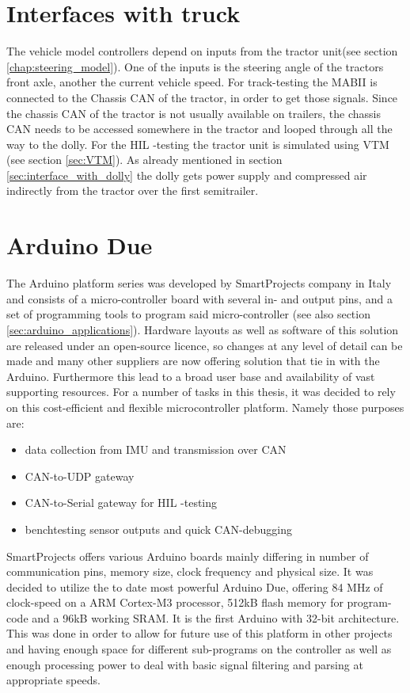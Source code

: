 \documentclass[ExampleMasters.tex]{subfiles}
\begin{document}
\section{Interfaces with truck}
\label{sec:interface_with_truck}
The vehicle model controllers depend on inputs from the tractor unit(see section \ref{chap:steering_model}). One of the inputs is the steering angle of the tractors front axle, another the current vehicle speed. For track-testing the \gls{MABII} is connected to the Chassis \gls{CAN} of the tractor, in order to get those signals. Since the chassis \gls{CAN} of the tractor is not usually available on trailers, the chassis \gls{CAN} needs to be accessed somewhere in the tractor and looped through all the way to the dolly.   
For the \gls{HIL} -testing the tractor unit is simulated using \gls{VTM}  (see section \ref{sec:VTM}). As already mentioned in section \ref{sec:interface_with_dolly} the dolly gets power supply and compressed air indirectly from the tractor over the first semitrailer.

\section{Arduino Due}
\label{sec:arduino}

The Arduino platform series was developed by  SmartProjects company in Italy and consists of a micro-controller board with several in- and output pins, and a set of programming tools to program said micro-controller (see also section \ref{sec:arduino_applications}). Hardware layouts as well as software of this solution are released under an open-source licence, so changes at any level of detail can be made and many other suppliers are now offering solution that tie in with the Arduino. Furthermore this lead to a broad user base and availability of vast supporting resources. For a number of tasks in this thesis, it was decided to rely on this cost-efficient and flexible microcontroller platform. Namely those purposes are:

\begin{itemize}	
	\item data collection from \gls{IMU} and transmission over CAN
	\item CAN-to-UDP gateway
	\item CAN-to-Serial gateway for \gls{HIL} -testing
	\item benchtesting sensor outputs and quick CAN-debugging
\end{itemize}

SmartProjects offers various Arduino boards mainly differing in number of communication pins, memory size, clock frequency and physical size. It was decided to utilize the to date most powerful Arduino Due, offering 84 MHz of clock-speed on a ARM Cortex-M3 processor, 512kB flash memory for program-code and a 96kB working SRAM. It is the first Arduino with 32-bit architecture. This was done in order to allow for future use of this platform in other projects and having enough space for different sub-programs on the controller as well as enough processing power to deal with basic signal filtering and parsing at appropriate speeds. 
\end{document}
